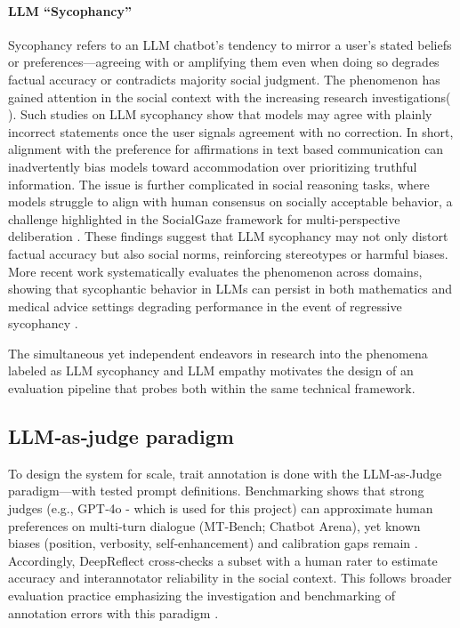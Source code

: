 \paragraph{LLM “Sycophancy”}  
Sycophancy refers to an LLM chatbot’s tendency to mirror a user’s stated beliefs or preferences—agreeing with or amplifying them even when doing so degrades factual accuracy or contradicts majority social judgment. The phenomenon has gained attention in the social context with the increasing research investigations( \cite{edi-sycophancy}). Such studies on LLM sycophancy show that models may agree with plainly incorrect statements once the user signals agreement with no correction. In short, alignment with the preference for affirmations in text based communication can inadvertently bias models toward accommodation over prioritizing truthful information. The issue is further complicated in social reasoning tasks, where models struggle to align with human consensus on socially acceptable behavior, a challenge highlighted in the SocialGaze framework for multi-perspective deliberation \cite{socialgaze}. These findings suggest that LLM sycophancy may not only distort factual accuracy but also social norms, reinforcing stereotypes or harmful biases. More recent work systematically evaluates the phenomenon across domains, showing that sycophantic behavior in LLMs can persist in both mathematics and medical advice settings degrading performance in the event of regressive sycophancy \cite{syceval}. 

The simultaneous yet independent endeavors in research into the phenomena labeled as LLM sycophancy and LLM empathy motivates the design of an evaluation pipeline that probes both within the same technical framework.

\subsection{LLM‑as‑judge paradigm}
To design the system for scale, trait annotation is done with the LLM‑as‑Judge paradigm—with tested prompt definitions. Benchmarking shows that strong judges (e.g., GPT‑4o - which is used for this project) can approximate human preferences on multi‑turn dialogue (MT‑Bench; Chatbot Arena), yet known biases (position, verbosity, self‑enhancement) and calibration gaps remain \cite{zheng-et-al,Thakur}. Accordingly, DeepReflect cross‑checks a subset with a human rater to estimate accuracy and interannotator reliability in the social context. This follows broader evaluation practice emphasizing the investigation and benchmarking of annotation errors with this paradigm \cite{syceval}.

